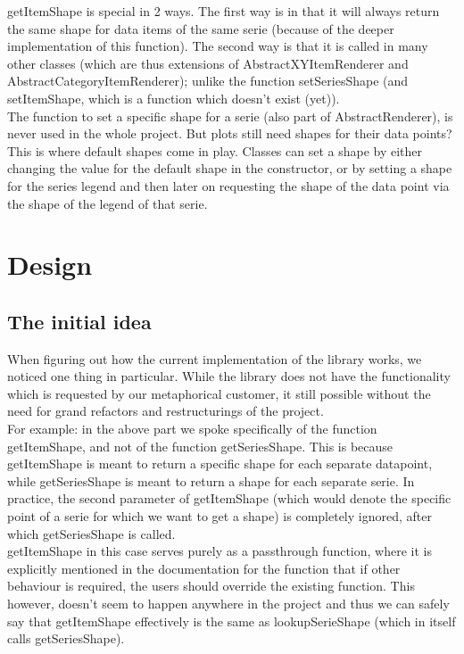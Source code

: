 \documentclass{article}
\begin{document}
getItemShape is special in 2 ways. The first way is in that it will always return the same shape for data items of the same serie (because of the deeper implementation of this function). The second way is that it is called in many other classes (which are thus extensions of AbstractXYItemRenderer and AbstractCategoryItemRenderer); unlike the function setSeriesShape (and setItemShape, which is a function which doesn't exist (yet)).\\

The function to set a specific shape for a serie (also part of AbstractRenderer), is never used in the whole project. But plots still need shapes for their data points? This is where default shapes come in play. Classes can set a shape by either changing the value for the default shape in the constructor, or by setting a shape for the series legend and then later on requesting the shape of the data point via the shape of the legend of that serie. 

\section{Design}

\subsection{The initial idea}

When figuring out how the current implementation of the library works, we noticed one thing in particular. While the library does not have the functionality which is requested by our metaphorical customer, it still possible without the need for grand refactors and restructurings of the project.\\

For example: in the above part we spoke specifically of the function getItemShape, and not of the function getSeriesShape. This is because getItemShape is meant to return a specific shape for each separate datapoint, while getSeriesShape is meant to return a shape for each separate serie. In practice, the second parameter of getItemShape (which would denote the specific point of a serie for which we want to get a shape) is completely ignored, after which getSeriesShape is called.\\

getItemShape in this case serves purely as a passthrough function, where it is explicitly mentioned in the documentation for the function that if other behaviour is required, the users should override the existing function. This however, doesn't seem to happen anywhere in the project and thus we can safely say that getItemShape effectively is the same as lookupSerieShape (which in itself calls getSeriesShape).\\
\end{document}
